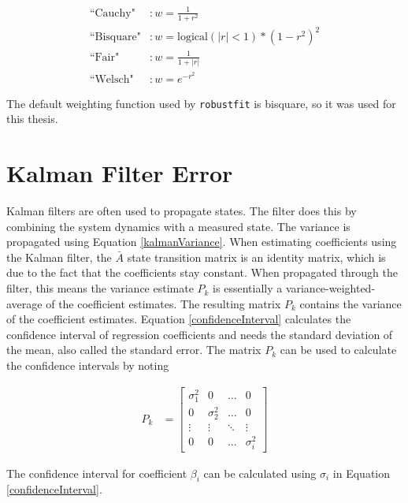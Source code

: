 \begin{align}
\text{``Cauchy"} &: w = \frac{1}{1+r^2}\\
\text{``Bisquare"} &: w = \text{logical}(|r|<1)*(1-r^2)^2\\
\text{``Fair"} &: w =\frac{1}{1+|r|}\\
\text{``Welsch"} &: w = e^{-r^2}
\end{align}

The default weighting function used by \texttt{robustfit} is bisquare, so it was used for this thesis.

\section{Kalman Filter Error}
Kalman filters are often used to propagate states. The filter does this by combining the system dynamics with a measured state. The variance is propagated using Equation \ref{kalmanVariance}. When estimating coefficients using the Kalman filter, the $\bar{A}$ state transition matrix is an identity matrix, which is due to the fact that the coefficients stay constant. When propagated through the filter, this means the variance estimate $P_k$ is essentially a variance-weighted-average of the coefficient estimates. The resulting matrix $P_k$ contains the variance of the coefficient estimates. Equation \ref{confidenceInterval} calculates the confidence interval of regression coefficients and needs the standard deviation of the mean, also called the standard error. The matrix $P_k$ can be used  to calculate the confidence intervals by noting

\begin{align}
P_k &= \begin{bmatrix}
\sigma_{1}^2 &  0  & \ldots & 0\\
0  &  \sigma_{2}^2 & \ldots & 0\\
\vdots & \vdots & \ddots & \vdots\\
0  &   0       &\ldots & \sigma_i^2
\end{bmatrix}
\end{align}

The confidence interval for coefficient $\beta_i$ can be calculated using $\sigma_i$ in Equation \ref{confidenceInterval}.
